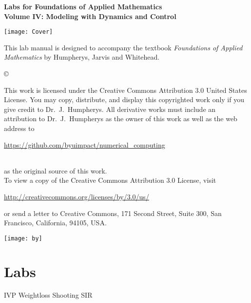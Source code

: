 \documentclass[nociteref]{SIAM-GH-book}
\begin{document}

\thispagestyle{empty} %

\begin{center}
{\huge \bf Labs for Foundations of Applied Mathematics} \\
\vspace{5mm}
{\Large \bf Volume IV: Modeling with Dynamics and Control}
\vspace{20mm}

\texttt{[image: Cover]}
\end{center}
\frontmatter



\begin{thepreface} %

This lab manual is designed to accompany the textbook \emph{Foundations of Applied Mathematics} by Humpherys, Jarvis and Whitehead.

\vfill
\copyright{This work is licensed under the Creative Commons Attribution 3.0 United States 
License.  You may copy, distribute, and display this copyrighted work only if you give 
credit to Dr.~J.~Humpherys. All derivative works must include an attribution to Dr.~J.~Humpherys as the owner of this work as well as the web address to 
\\\centerline{\url{https://github.com/byuimpact/numerical_computing}}\\ as the original source of 
this 
work.\\To view a copy of the Creative Commons Attribution 3.0 License, 
visit\\\centerline{\url{http://creativecommons.org/licenses/by/3.0/us/}} or send a letter to 
Creative Commons, 171 Second Street, Suite 300, San Francisco, California, 94105, USA.}

\vfill
\centering\texttt{[image: by]}
\vfill
\end{thepreface}

\setcounter{tocdepth}{1}
\tableofcontents

\mainmatter


\part{Labs}
{IVP}
{Weightloss}
{Shooting}
{SIR}
\end{document}
